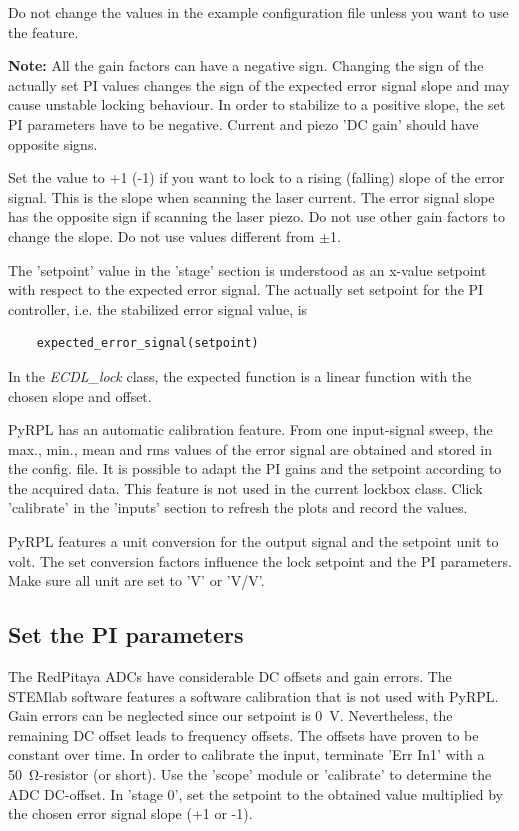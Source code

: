 \documentclass[twoside,a4paper]{refart}
\begin{document}
Do not change the values in the example configuration file unless you want to use the feature.

\textbf{Note:}
All the gain factors can have a negative sign. Changing the sign of the actually set PI values changes the sign of the expected error signal slope and may cause unstable locking behaviour. In order to stabilize to a positive slope, the set PI parameters have to be negative. Current and piezo 'DC gain' should have opposite signs.

Set the value to +1  (-1) if you want to lock to a rising (falling) slope of the error signal. This is the slope when scanning the laser current. The error signal slope has the opposite sign if scanning the laser piezo. Do not use other gain factors to change the slope. Do not use values different from $\pm$1.


The 'setpoint' value in the 'stage' section is understood as an x-value setpoint with respect to the expected error signal. The actually set setpoint for the PI controller, i.e. the stabilized error signal value, is
\begin{tcolorbox}
	\begin{verbatim}
	expected_error_signal(setpoint)
	\end{verbatim}
\end{tcolorbox}

In  the \textit{ECDL\_lock} class, the expected function is a linear function with the chosen slope and offset.  

PyRPL has an automatic calibration feature. From one input-signal sweep, the max., min., mean and rms values of the error signal are obtained and stored in the config. file. It is possible to adapt the PI gains and the setpoint according to the acquired data. This feature is not used in the current lockbox class. Click 'calibrate' in the 'inputs' section to refresh the plots and record the values.

PyRPL features a unit conversion for the output signal and the setpoint unit to volt. The set conversion factors influence the lock setpoint and the PI parameters. Make sure all unit are set to 'V' or 'V/V'.

\subsection{Set the PI parameters}
The RedPitaya ADCs have considerable DC offsets and gain errors. The STEMlab software features a software calibration that is not used with PyRPL. Gain errors can be neglected since our setpoint is \qty{0}{\volt}. Nevertheless, the remaining DC offset leads to frequency offsets. The offsets have proven to be constant over time. In order to calibrate the input, terminate 'Err In1' with a \qty{50}{\ohm}-resistor (or short). Use the 'scope' module or 'calibrate' to determine the ADC DC-offset. In 'stage 0', set the setpoint to the obtained value multiplied by the chosen error signal slope (+1 or -1).
\end{document}
